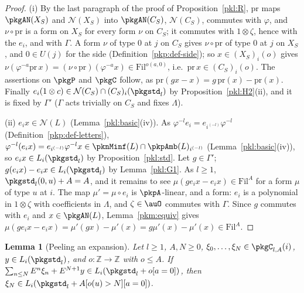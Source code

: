 \documentclass[10pt]{amsart}
\newtheorem{lemma}[theorem]{Lemma}
\theoremstyle{definition}
\theoremstyle{remark}
\newcommand{\Z}{\mathbb Z}
\begin{document}
\begin{proof}
(i) By the last paragraph of the proof of Proposition~\ref{pkl:R}, $\mathrm{pr}$ maps $\pkgAN(X_S)$ and
$\mathcal N(X_S)$ into $\pkgAN(C_S)$, $\mathcal N(C_S)$, commutes with $\varphi$, and $\nu\circ\mathrm{pr}$ is
a form on $X_S$ for every form $\nu$ on $C_S$; it commutes with $1\otimes\zeta$, hence with the $e_i$, and
with $\Gamma$. A form $\nu$ of type $0$ at $j$ on $C_S$ gives $\nu\circ\mathrm{pr}$ of type $0$ at $j$ on
$X_S$, and $0\in U(j)$ for the side (Definition~\ref{pkp:def-side}); so $x\in(X_S)_i(o)$ gives
$\nu(\varphi^{-a}\mathrm{pr}\,x)=(\nu\circ\mathrm{pr})(\varphi^{-a}x)\in\mathrm{Fil}^{o(a,0)}$, i.e.\
$\mathrm{pr}\,x\in(C_S)_i(o)$. The assertions on $\pkgP$ and $\pkgC$ follow, as $\mathrm{pr}(gx-x)=
g\,\mathrm{pr}(x)-\mathrm{pr}(x)$. Finally $e_i(1\otimes c)\in\mathcal N(C_S)\cap(C_S)_i(\pkgstd_l)$ by
Proposition~\ref{pkl:H2}(ii), and it is fixed by $\Gamma'$ ($\Gamma$ acts trivially on $C_S$ and fixes
$\Lambda$).

(ii) $e_ix\in\mathcal N(L)$ (Lemma~\ref{pkl:basic}(iv)). As $\varphi^{-l}e_i=e_{i^{(-l)}}\varphi^{-l}$
(Definition~\ref{pkp:def-letters}), $\varphi^{-l}(e_ix)=e_{i^{(-l)}}\varphi^{-l}x\in\pknMinf(L)\cap
\pkpAmb(L)_{i^{(-l)}}$ (Lemma~\ref{pkl:basic}(iv)), so $e_ix\in L_i(\pkgstd_l)$ by
Proposition~\ref{pkl:std}. Let $g\in\Gamma'$; $g(e_ix)-e_ix\in L_i(\pkgstd_l)$ by Lemma~\ref{pkl:G1}. As
$l\ge1$, $\pkgstd_l(0,u)+A=A$, and it remains to see $\mu(g e_ix-e_ix)\in\mathrm{Fil}^A$ for a form $\mu$ of
type $u$ at $i$. The map $\mu'=\mu\circ e_i$ is $\pkpA$-linear, and a form: $e_i$ is a polynomial in
$1\otimes\zeta$ with coefficients in $\Lambda$, and $\zeta\in\auO$ commutes with $\Gamma$. Since $g$
commutes with $e_i$ and $x\in\pkgAN(L)$, Lemma~\ref{pkm:equiv} gives $\mu(ge_ix-e_ix)=\mu'(gx)-\mu'(x)=
g\mu'(x)-\mu'(x)\in\mathrm{Fil}^A$.
\end{proof}

\begin{lemma}[Peeling an expansion]\label{pkg:peel}
Let $l\ge1$, $A,N\ge0$, $\xi_0,\dots,\xi_N\in\pkgC_{l,A}(i)$, $y\in L_i(\pkgstd_l)$, and $o\colon\Z\to\Z$
with $o\le A$. If $\sum_{n\le N}E^n\xi_n+E^{N+1}y\in L_i(\pkgstd_l+o[a=0])$, then
$\xi_N\in L_i(\pkgstd_l+A[o(u)>N][a=0])$.
\end{lemma}
\end{document}
